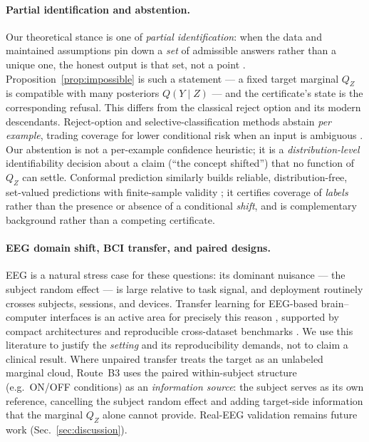 \paragraph{Partial identification and abstention.}
Our theoretical stance is one of \emph{partial identification}: when the data and maintained assumptions pin
down a \emph{set} of admissible answers rather than a unique one, the honest output is that set, not a point
\cite{manski2003partial}. Proposition~\ref{prop:impossible} is such a statement --- a fixed target marginal
$Q_Z$ is compatible with many posteriors $Q(Y\mid Z)$ --- and the certificate's \stunid{} state is the
corresponding refusal. This differs from the classical reject option and its modern descendants.
Reject-option and selective-classification methods abstain \emph{per example}, trading coverage for lower
conditional risk when an input is ambiguous \cite{chow1970reject,geifman2017selective}. Our abstention is not a
per-example confidence heuristic; it is a \emph{distribution-level} identifiability decision about a claim
(``the concept shifted'') that no function of $Q_Z$ can settle. Conformal prediction similarly builds reliable,
distribution-free, set-valued predictions with finite-sample validity \cite{shafer2008conformal,vovk2005algorithmic};
it certifies coverage of \emph{labels} rather than the presence or absence of a conditional \emph{shift}, and
is complementary background rather than a competing certificate.

\paragraph{EEG domain shift, BCI transfer, and paired designs.}
EEG is a natural stress case for these questions: its dominant nuisance --- the subject random effect --- is
large relative to task signal, and deployment routinely crosses subjects, sessions, and devices. Transfer
learning for EEG-based brain--computer interfaces is an active area for precisely this reason
\cite{wu2022eegtransfer}, supported by compact architectures \cite{lawhern2018eegnet} and reproducible
cross-dataset benchmarks \cite{jayaram2018moabb}. We use this literature to justify the \emph{setting} and its
reproducibility demands, not to claim a clinical result. Where unpaired transfer treats the target as an
unlabeled marginal cloud, Route~B3 uses the paired within-subject structure (e.g.\ ON/OFF conditions) as an
\emph{information source}: the subject serves as its own reference, cancelling the subject random effect and
adding target-side information that the marginal $Q_Z$ alone cannot provide.
Real-EEG validation remains future work (Sec.~\ref{sec:discussion}).

